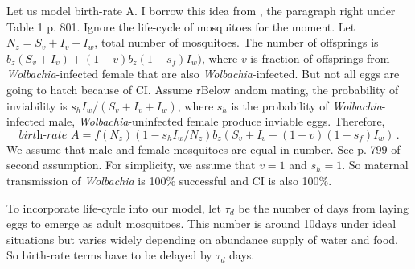 \documentclass[12pt,leqno]{article}
\begin{document}
Let us model birth-rate A.  I borrow this idea from \cite{Hughes2013}, the paragraph right under Table 1 p. 801. Ignore the life-cycle of mosquitoes for the moment. Let $N_{z} = S_v+I_v+I_w$, total number of mosquitoes. The number of offsprings is $b_z(S_v + I_v) + (1-v)b_z(1-s_f)I_w)$, where $v$ is fraction of offsprings from {\it Wolbachia}-infected female that are also {\it Wolbachia}-infected. But not all eggs are going to hatch because of CI. Assume rBelow andom mating, the probability of inviability is $s_hI_w/(S_v+I_v+I_w)$, where $s_h$ is the probability of {\it Wolbachia}-infected male, {\it Wolbachia}-uninfected female produce inviable eggs. Therefore, 
\[
\textit{birth-rate A} = f(N_z)(1 - s_h I_w/N_z)b_z(S_v+I_v+(1-v)(1-s_f)I_w)\,.
\]
We assume that male and female mosquitoes are equal in number. See p. 799 of \citep{Hughes2013} second assumption. For simplicity, we assume that $v=1$ and $s_h=1$. So maternal transmission of {\it Wolbachia} is 100\% successful and CI is also 100\%.\smallskip

To incorporate life-cycle into our model, let $\tau_d$ be the number of days from laying eggs to emerge as adult mosquitoes. This number is around 10days under ideal situations but varies widely depending on abundance supply of water and food. So birth-rate terms have to be delayed by $\tau_d$ days. 

\end{document}

